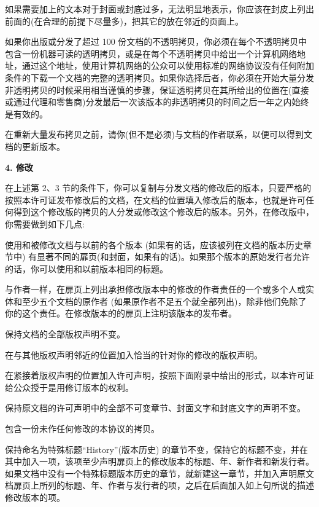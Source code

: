 如果需要加上的文本对于封面或封底过多，无法明显地表示，你应该在封皮上列出前面的(在合理的前提下尽量多)，把其它的放在邻近的页面上。

如果你出版或分发了超过 100 份文档的不透明拷贝，你必须在每个不透明拷贝中包含一份机器可读的透明拷贝，或是在每个不透明拷贝中给出一个计算机网络地址，通过这个地址，使用计算机网络的公众可以使用标准的网络协议没有任何附加条件的下载一个文档的完整的透明拷贝。如果你选择后者，你必须在开始大量分发非透明拷贝的时候采用相当谨慎的步骤，保证透明拷贝在其所给出的位置在(直接或通过代理和零售商)分发最后一次该版本的非透明拷贝的时间之后一年之内始终是有效的。

在重新大量发布拷贝之前，请你(但不是必须)与文档的作者联系，以便可以得到文档的更新版本。


\begin{center}
{\Large\bf 4. 修改\par}
\end{center}



在上述第 2、3 节的条件下，你可以复制与分发文档的修改后的版本，只要严格的按照本许可证发布修改后的文档，在文档的位置填入修改后的版本，也就是许可任何得到这个修改版的拷贝的人分发或修改这个修改后的版本。另外，在修改版中，你需要做到如下几点:

使用和被修改文档与以前的各个版本 (如果有的话，应该被列在文档的版本历史章节中) 有显著不同的扉页(和封面，如果有的话)。如果那个版本的原始发行者允许的话，你可以使用和以前版本相同的标题。 

与作者一样，在扉页上列出承担修改版本中的修改的作者责任的一个或多个人或实体和至少五个文档的原作者 (如果原作者不足五个就全部列出)，除非他们免除了你的这个责任。在修改版本的的扉页上注明该版本的发布者。

保持文档的全部版权声明不变。 

在与其他版权声明邻近的位置加入恰当的针对你的修改的版权声明。 

在紧接着版权声明的位置加入许可声明，按照下面附录中给出的形式，以本许可证给公众授于是用修订版本的权利。 

保持原文档的许可声明中的全部不可变章节、封面文字和封底文字的声明不变。 

包含一份未作任何修改的本协议的拷贝。

保持命名为特殊标题``History''(版本历史) 的章节不变，保持它的标题不变，并在其中加入一项，该项至少声明扉页上的修改版本的标题、年、新作者和新发行者。如果文档中没有一个特殊标题版本历史的章节，就新建这一章节，并加入声明原文档扉页上所列的标题、年、作者与发行者的项，之后在后面加入如上句所说的描述修改版本的项。 

